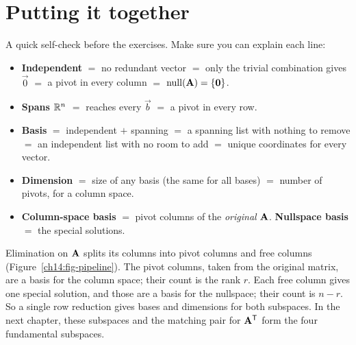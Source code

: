 \section{Putting it together}
\label{ch14:together}

\begin{recoverybox}
A quick self-check before the exercises. Make sure you can explain each line:
\begin{itemize}
  \item \textbf{Independent} $=$ no redundant vector $=$ only the trivial
        combination gives $\vec{0}$ $=$ a pivot in every column $=$
        $\operatorname{null}(\mathbf{A}) = \{\mathbf{0}\}$.
  \item \textbf{Spans $\mathbb{R}^n$} $=$ reaches every $\vec{b}$ $=$ a pivot in every row.
  \item \textbf{Basis} $=$ independent $+$ spanning $=$ a spanning list with nothing to remove $=$
        an independent list with no room to add $=$ unique coordinates for every vector.
  \item \textbf{Dimension} $=$ size of any basis (the same for all bases) $=$ number of
        pivots, for a column space.
  \item \textbf{Column-space basis} $=$ pivot columns of the \emph{original}
        $\mathbf{A}$. \textbf{Nullspace basis} $=$ the special solutions.
\end{itemize}
\end{recoverybox}

Elimination on $\mathbf{A}$ splits its columns into pivot columns and free columns
(Figure~\ref{ch14:fig-pipeline}).
The pivot columns, taken from the original matrix, are a basis for the column
space; their count is the rank $r$. Each free column gives one special
solution, and those are a basis for the nullspace; their count is $n - r$. So a single row
reduction gives bases and dimensions for both subspaces.
In the next chapter, these subspaces and the matching pair for $\mathbf{A}^{\mathsf{T}}$
form the four fundamental subspaces.

